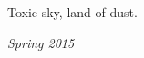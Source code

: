 Toxic sky, land of dust.

\begin{flushright}
\textit{Spring 2015}
\end{flushright}



\groupendnotes

